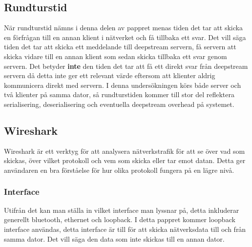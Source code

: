 \subsection{Rundturstid}
När rundturstid nämns i denna delen av pappret menas tiden det tar att skicka en förfrågan till en annan klient i nätverket och få tillbaka ett svar. Det vill säga tiden det tar att skicka ett meddelande till deepstream servern, få servern att skicka vidare till en annan klient som sedan skicka tillbaka ett svar genom servern. Det betyder \textbf{inte} den tiden det tar att få ett direkt svar från deepstream servern då detta inte ger ett relevant värde eftersom att klienter aldrig kommunicera direkt med servern. I denna undersökningen körs både server och två klienter på samma dator, så rundturstiden kommer till stor del reflektera serialisering, deserialisering och eventuella deepstream overhead på systemet.

\subsection{Wireshark}
Wireshark\cite{wireshark:main} är ett verktyg för att analysera nätverkstrafik för att se över vad som skickas, över vilket protokoll och vem som skicka eller tar emot datan. Detta ger användaren en bra förståelse för hur olika protokoll fungera på en lägre nivå.

\subsubsection{Interface}
Utifrån det kan man ställa in vilket interface\cite[p.~364]{networking} man lyssnar på, detta inkluderar generellt bluetooth, ethernet och loopback. I detta pappret kommer loopback interface användas, detta interface är till för att skicka nätverksdata till och från samma dator. Det vill säga den data som inte skickas till en annan dator.
